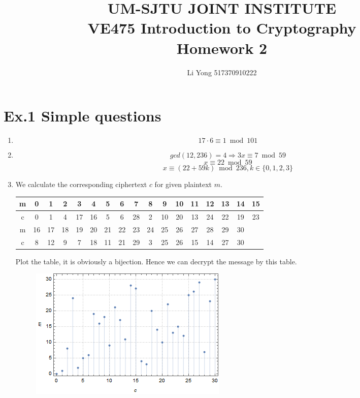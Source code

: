 \documentclass[a4paper]{article}
\title{UM-SJTU JOINT INSTITUTE\\VE475 Introduction to Cryptography\\\vspace{0.5cm} Homework 2}
\author{Li Yong 517370910222}
\begin{document}
\maketitle
\newpage

\section*{Ex.1 Simple questions}
	\begin{enumerate}
		\item
		$$17 \cdot 6 \equiv 1 \bmod 101$$
		\item
		$$gcd(12, 236) = 4 \Rightarrow 3x \equiv 7 \bmod 59$$
		$$x \equiv 22 \bmod 59$$
		$$x \equiv (22 + 59k) \bmod 236, k \in \{0, 1, 2, 3\}$$
		\item
		We calculate the corresponding ciphertext $c$ for given plaintext $m$.
		\begin{table}[htbp]
  		\centering
	    \begin{tabular}{c|cccccccccccccccc}
			\hline
	    m     & 0     & 1     & 2     & 3     & 4     & 5     & 6     & 7     & 8     & 9     & 10    & 11    & 12    & 13    & 14    & 15 \\
			\hline
	    c     & 0     & 1     & 4     & 17    & 16    & 5     & 6     & 28    & 2     & 10    & 20    & 13    & 24    & 22    & 19    & 23 \\
			\hline
	    m     & 16    & 17    & 18    & 19    & 20    & 21    & 22    & 23    & 24    & 25    & 26    & 27    & 28    & 29    & 30    &  \\
			\hline
	    c     & 8     & 12    & 9     & 7     & 18    & 11    & 21    & 29    & 3     & 25    & 26    & 15    & 14    & 27    & 30    &  \\
			\hline
    	\end{tabular}
		\end{table}
		\par Plot the table, it is obviously a bijection. Hence we can decrypt the message by this table.
		\begin{figure}[!htb]
			\centering
			\includegraphics[scale=0.7]{1.png}

\end{figure}
\end{enumerate}
\end{document}
